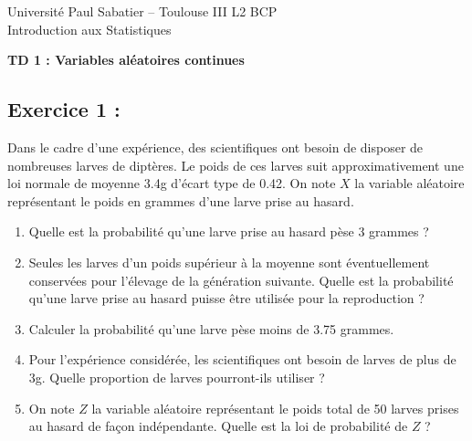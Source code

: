 \documentclass[11pt]{article}
\numberwithin{equation}{section}
\begin{document}
\noindent Université Paul Sabatier -- Toulouse III
\hfill L2 BCP\\
\noindent Introduction aux Statistiques

\bigskip
\bigskip


\begin{center}
{\bf \large TD 1 : Variables aléatoires continues}\\
{\bf \large }
\end{center}

\bigskip

\subsection*{Exercice 1 :}
Dans le cadre d'une expérience, des scientifiques ont besoin de disposer de nombreuses larves de 
diptères. Le poids de ces larves suit approximativement une loi normale de moyenne 3.4g d'écart type 
de 0.42. On note $X$ la variable aléatoire représentant le poids en grammes d'une larve prise au hasard.

\begin{enumerate}
\item Quelle est la probabilité qu'une larve prise au hasard pèse 3 grammes ?
\item Seules les larves d'un poids supérieur à la moyenne sont éventuellement conservées pour l'élevage de la génération suivante. Quelle est la probabilité qu'une larve prise au hasard puisse être utilisée pour la reproduction ?
\item Calculer la probabilité qu'une larve pèse moins de 3.75 grammes.
\item Pour l'expérience considérée, les scientifiques ont besoin de larves de plus de 3g. Quelle proportion de larves pourront-ils utiliser ?
\item On note $Z$ la variable aléatoire représentant le poids total de 50 larves prises au hasard de 
façon indépendante. Quelle est la loi de probabilité de $Z$ ?
\end{enumerate}

\bigskip
\end{document}
